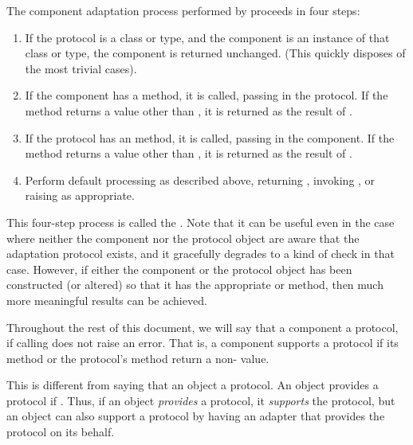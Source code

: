 The component adaptation process performed by  proceeds
in four steps:

\begin{enumerate}

\item If the protocol is a class or type, and the component is an instance
of that class or type, the component is returned unchanged.  (This quickly
disposes of the most trivial cases).

\item If the component has a  method, it is called,
passing in the protocol.  If the method returns a value other than
, it is returned as the result of .

\item If the protocol has an  method, it is called,
passing in the component.  If the method returns a value other than
, it is returned as the result of .

\item Perform default processing as described above, returning ,
invoking , or raising  as
appropriate.

\end{enumerate}

This four-step process is called the .  Note
that it can be useful even in the case where neither the component nor the
protocol object are aware that the adaptation protocol exists, and it
gracefully degrades to a kind of  check in that
case.  However, if either the component or the protocol object has been
constructed (or altered) so that it has the appropriate 
or  method, then much more meaningful results can be
achieved.

Throughout the rest of this document, we will say that a component
 a protocol, if calling  does
not raise an error.  That is, a component supports a protocol if its
 method or the protocol's  method
return a non- value.

This is different from saying that an object  a protocol.  An
object provides a protocol if .  Thus,
if an object \emph{provides} a protocol, it \emph{supports} the protocol, but
an object can also support a protocol by having an adapter that provides the
protocol on its behalf.


